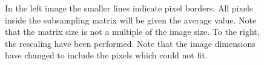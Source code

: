 \documentclass[a4paper, 10pt, final]{article}
\begin{document}
\begin{figure}[!h]
    \centering
    \hspace{1em}
    \caption{In the left image the smaller lines indicate pixel borders. All
    pixels inside the subsampling matrix will be given the average
    value. Note that the matrix size is not a multiple of the image
    size. To the right, the rescaling have been performed. Note that the
    image dimensions have changed to include the pixels which could not
    fit.}
    \label{lenagrid}
\end{figure}





\end{document}
